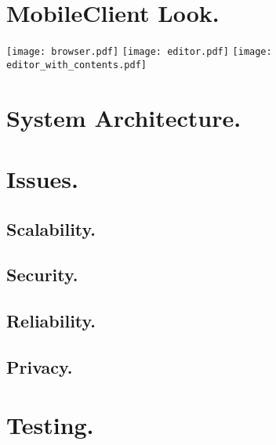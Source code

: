 \documentclass[10pt,a4paper]{article}
\begin{document}
\section*{MobileClient Look.}
\texttt{[image: browser.pdf]}
\texttt{[image: editor.pdf]}
\texttt{[image: editor\_with\_contents.pdf]}
\newpage
\section*{System Architecture.}
\newpage
\section*{Issues.}

\subsection*{Scalability.}
\subsection*{Security.}
\subsection*{Reliability.}
\subsection*{Privacy.}
\newpage
\section*{Testing.}
\end{document}
